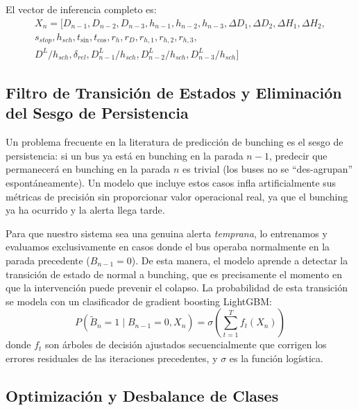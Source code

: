 \documentclass[fleqn,10pt,lineno]{wlpeerj}
\begin{document}
El vector de inferencia completo es:
\begin{multline}
  X_n = \bigl[ D_{n-1}, D_{n-2}, D_{n-3}, h_{n-1}, h_{n-2}, h_{n-3},
  \Delta D_{1}, \Delta D_{2}, \Delta H_{1}, \Delta H_{2},\\
  s_{stop}, h_{sch}, t_{\sin}, t_{\cos},
  r_h, r_D, r_{h,1}, r_{h,2}, r_{h,3},\\
  D^{L}/h_{sch}, \delta_{rel}, D^{L}_{n-1}/h_{sch}, D^{L}_{n-2}/h_{sch}, D^{L}_{n-3}/h_{sch} \bigr]
\end{multline}

\subsection{Filtro de Transici\'on de Estados y Eliminaci\'on del Sesgo de Persistencia}

Un problema frecuente en la literatura de predicci\'on de bunching es el sesgo de persistencia: si un bus ya est\'a en bunching en la parada $n{-}1$, predecir que permanecer\'a en bunching en la parada $n$ es trivial (los buses no se ``des-agrupan'' espont\'aneamente). Un modelo que incluye estos casos infla artificialmente sus m\'etricas de precisi\'on sin proporcionar valor operacional real, ya que el bunching ya ha ocurrido y la alerta llega tarde.

Para que nuestro sistema sea una genuina alerta \textit{temprana}, lo entrenamos y evaluamos exclusivamente en casos donde el bus operaba normalmente en la parada precedente ($B_{n-1}=0$). De esta manera, el modelo aprende a detectar la transici\'on de estado de normal a bunching, que es precisamente el momento en que la intervenci\'on puede prevenir el colapso. La probabilidad de esta transici\'on se modela con un clasificador de gradient boosting LightGBM:
\begin{equation}
  P(\tilde{B}_n=1 \mid B_{n-1}=0, X_n) = \sigma\!\left(\sum_{t=1}^{T} f_t(X_n)\right)
\end{equation}
donde $f_t$ son \'arboles de decisi\'on ajustados secuencialmente que corrigen los errores residuales de las iteraciones precedentes, y $\sigma$ es la funci\'on log\'istica.

\subsection{Optimizaci\'on y Desbalance de Clases}
\end{document}

